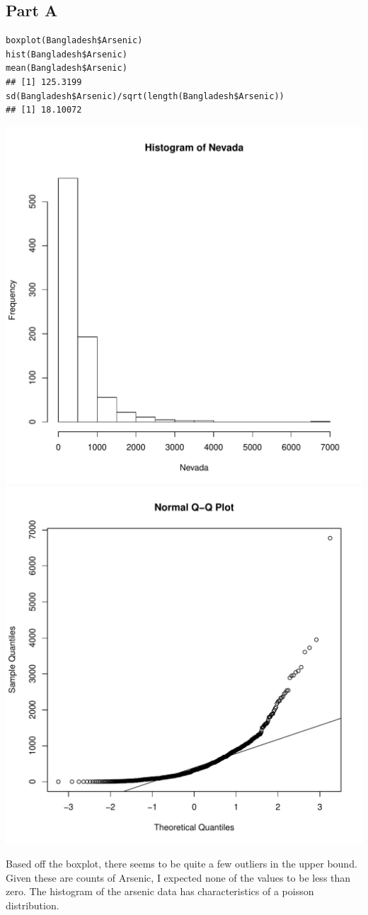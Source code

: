 \documentclass{article}\usepackage[]{graphicx}\usepackage[]{color}
\makeatletter
\newenvironment{kframe}{%
 \def\at@end@of@kframe{}%
 \ifinner\ifhmode%
  \def\at@end@of@kframe{\end{minipage}}%
  \begin{minipage}{\columnwidth}%
 \fi\fi%
 \def\FrameCommand##1{\hskip\@totalleftmargin \hskip-\fboxsep
 \colorbox{shadecolor}{##1}\hskip-\fboxsep
     \hskip-\linewidth \hskip-\@totalleftmargin \hskip\columnwidth}%
 \MakeFramed {\advance\hsize-\width
   \@totalleftmargin\z@ \linewidth\hsize
   \@setminipage}}%
 {\par\unskip\endMakeFramed%
 \at@end@of@kframe}
\newenvironment{knitrout}{}{} %
\makeatother
\begin{document}
\subsection*{Part A}
\begin{knitrout}
\color{fgcolor}\begin{kframe}
\begin{verbatim}
boxplot(Bangladesh$Arsenic)
hist(Bangladesh$Arsenic)
mean(Bangladesh$Arsenic)
## [1] 125.3199
sd(Bangladesh$Arsenic)/sqrt(length(Bangladesh$Arsenic))
## [1] 18.10072
\end{verbatim}
\end{kframe}
\includegraphics[width=0.33\linewidth]{figure/unnamed-chunk-4-1} 
\includegraphics[width=0.33\linewidth]{figure/unnamed-chunk-4-2} 

\end{knitrout}
Based off the boxplot, there seems to be quite a few outliers in the upper bound. Given these are counts of Arsenic, I expected none of the values to be less than zero. The histogram of the arsenic data has characteristics of a poisson distribution.
\end{document}
